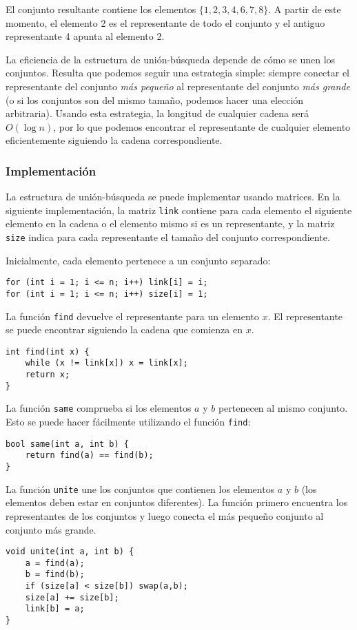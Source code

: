 El conjunto resultante contiene los elementos
$\{1,2,3,4,6,7,8\}$.
A partir de este momento, el elemento 2 es el representante
de todo el conjunto y el antiguo representante 4
apunta al elemento 2.

La eficiencia de la estructura de unión-búsqueda depende de
cómo se unen los conjuntos.
Resulta que podemos seguir una estrategia simple:
siempre conectar el representante del
conjunto \emph{más pequeño} al representante del conjunto \emph{más grande}
(o si los conjuntos son del mismo tamaño,
podemos hacer una elección arbitraria).
Usando esta estrategia, la longitud de cualquier cadena
será $O(\log n)$, por lo que podemos
encontrar el representante de cualquier elemento
eficientemente siguiendo la cadena correspondiente.

\subsubsection{Implementación}

La estructura de unión-búsqueda se puede implementar
usando matrices.
En la siguiente implementación,
la matriz \texttt{link} contiene para cada elemento
el siguiente elemento
en la cadena o el elemento mismo si es
un representante,
y la matriz \texttt{size} indica para cada representante
el tamaño del conjunto correspondiente.

Inicialmente, cada elemento pertenece a un conjunto separado:
\begin{lstlisting}
for (int i = 1; i <= n; i++) link[i] = i;
for (int i = 1; i <= n; i++) size[i] = 1;
\end{lstlisting}

La función \texttt{find} devuelve
el representante para un elemento $x$.
El representante se puede encontrar siguiendo
la cadena que comienza en $x$.

\begin{lstlisting}
int find(int x) {
    while (x != link[x]) x = link[x];
    return x;
}
\end{lstlisting}

La función \texttt{same} comprueba
si los elementos $a$ y $b$ pertenecen al mismo conjunto.
Esto se puede hacer fácilmente utilizando el
función \texttt{find}:

\begin{lstlisting}
bool same(int a, int b) {
    return find(a) == find(b);
}
\end{lstlisting}

\begin{samepage}
La función \texttt{unite} une los conjuntos
que contienen los elementos $a$ y $b$
(los elementos deben estar en conjuntos diferentes).
La función primero encuentra los representantes
de los conjuntos y luego conecta el más pequeño
conjunto al conjunto más grande.

\begin{lstlisting}
void unite(int a, int b) {
    a = find(a);
    b = find(b);
    if (size[a] < size[b]) swap(a,b);
    size[a] += size[b];
    link[b] = a;
}
\end{lstlisting}
\end{samepage}

